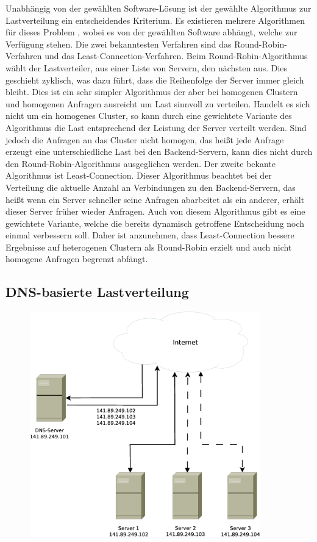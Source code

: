 \documentclass[a4paper, 12pt, BCOR10mm, DIV12, toc=bibliography, toc=listof, german]{scrbook}
\begin{document}
			Unabhängig von der gewählten Software-Lösung ist der gewählte Algorithmus zur Lastverteilung
			ein entscheidendes Kriterium. Es existieren mehrere Algorithmen für dieses Problem
			\cite{zinke2007}, wobei es von der gewählten Software abhängt, welche zur Verfügung stehen.
			Die zwei bekanntesten Verfahren sind das Round-Robin-Verfahren und das
			Least-Connection-Verfahren. Beim Round-Robin-Algorithmus wählt der Lastverteiler, aus einer
			Liste von Servern, den nächsten aus. Dies geschieht zyklisch, was dazu führt, dass die
			Reihenfolge der Server immer gleich bleibt. Dies ist ein sehr simpler Algorithmus der aber bei
			homogenen Clustern und homogenen Anfragen ausreicht um Last sinnvoll zu verteilen. Handelt es
			sich nicht um ein homogenes Cluster, so kann durch eine gewichtete Variante des Algorithmus
			die Last entsprechend der Leistung der Server verteilt werden. Sind jedoch die Anfragen an das
			Cluster nicht homogen, das heißt jede Anfrage erzeugt eine unterschiedliche Last bei den
			Backend-Servern, kann dies nicht durch den Round-Robin-Algorithmus ausgeglichen werden. Der
			zweite bekante Algorithmus ist Least-Connection. Dieser Algorithmus beachtet bei der
			Verteilung die aktuelle Anzahl an Verbindungen zu den Backend-Servern, das heißt wenn ein
			Server schneller seine Anfragen abarbeitet als ein anderer, erhält dieser Server früher wieder
			Anfragen. Auch von diesem Algorithmus gibt es eine gewichtete Variante, welche die bereits
			dynamisch getroffene Entscheidung noch einmal verbessern soll. Daher ist anzunehmen, dass
			Least-Connection bessere Ergebnisse auf heterogenen Clustern als Round-Robin erzielt und auch
			nicht homogene Anfragen begrenzt abfängt.


			\subsection*{DNS-basierte Lastverteilung} %

			\begin{figure}
				\centering
				\includegraphics[width=10cm]{images/dns-loadbalancer}
				\caption{}
				\label{fig:}
			\end{figure}
\end{document}
